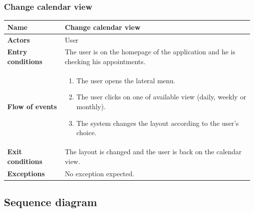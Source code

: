 \subsubsection{Change calendar view}
\begin{table}[!h]
	\centering
	{\renewcommand{\arraystretch}{2}%
		\begin{tabular}{|l|p{12cm}|}
			\hline
			\textbf{Name} 				& \textbf{Change calendar view} \\ \hline
			\textbf{Actors} 			& User \\ \hline
			\textbf{Entry conditions} 	& The user is on the homepage of the application and he is checking his appointments. \\ \hline
			\textbf{Flow of events}		& \begin{minipage}[t]{0.75\textwidth}
				\begin{enumerate}
					\item The user opens the lateral menu.
					\item The user clicks on one of available view (daily, weekly or monthly).
					\item The system changes the layout according to the user’s choice. 
				\end{enumerate}
			\end{minipage}	\\ \hline
			\textbf{Exit conditions}	& The layout is changed and the user is back on the calendar view.  \\ \hline
			\textbf{Exceptions}			& No exception expected.  \\ \hline
	\end{tabular}}
\end{table}
\clearpage

\subsection{Sequence diagram}
